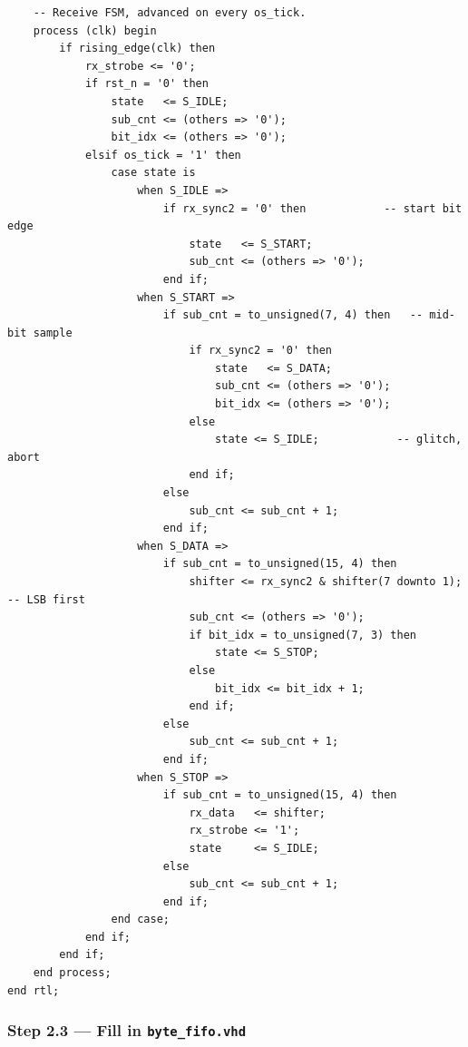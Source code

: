 \documentclass[11pt,letterpaper]{article}
\begin{document}
\begin{lstlisting}
    -- Receive FSM, advanced on every os_tick.
    process (clk) begin
        if rising_edge(clk) then
            rx_strobe <= '0';
            if rst_n = '0' then
                state   <= S_IDLE;
                sub_cnt <= (others => '0');
                bit_idx <= (others => '0');
            elsif os_tick = '1' then
                case state is
                    when S_IDLE =>
                        if rx_sync2 = '0' then            -- start bit edge
                            state   <= S_START;
                            sub_cnt <= (others => '0');
                        end if;
                    when S_START =>
                        if sub_cnt = to_unsigned(7, 4) then   -- mid-bit sample
                            if rx_sync2 = '0' then
                                state   <= S_DATA;
                                sub_cnt <= (others => '0');
                                bit_idx <= (others => '0');
                            else
                                state <= S_IDLE;            -- glitch, abort
                            end if;
                        else
                            sub_cnt <= sub_cnt + 1;
                        end if;
                    when S_DATA =>
                        if sub_cnt = to_unsigned(15, 4) then
                            shifter <= rx_sync2 & shifter(7 downto 1);  -- LSB first
                            sub_cnt <= (others => '0');
                            if bit_idx = to_unsigned(7, 3) then
                                state <= S_STOP;
                            else
                                bit_idx <= bit_idx + 1;
                            end if;
                        else
                            sub_cnt <= sub_cnt + 1;
                        end if;
                    when S_STOP =>
                        if sub_cnt = to_unsigned(15, 4) then
                            rx_data   <= shifter;
                            rx_strobe <= '1';
                            state     <= S_IDLE;
                        else
                            sub_cnt <= sub_cnt + 1;
                        end if;
                end case;
            end if;
        end if;
    end process;
end rtl;
\end{lstlisting}

\newpage
\subsubsection*{Step 2.3 --- Fill in \texttt{byte\_fifo.vhd}}
\end{document}
